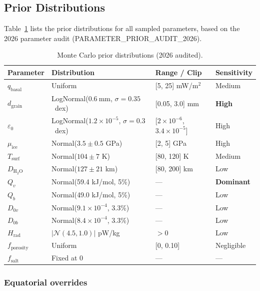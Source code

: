 \documentclass[11pt,a4paper]{article}
\begin{document}
\subsection{Prior Distributions}
\label{sec:priors}

Table~\ref{tab:priors} lists the prior distributions for all sampled
parameters, based on the 2026 parameter audit
(PARAMETER\_PRIOR\_AUDIT\_2026).

\begin{table}[h]
\centering
\caption{Monte Carlo prior distributions (2026 audited).}
\label{tab:priors}
\small
\begin{tabular}{llll}
\toprule
\textbf{Parameter} & \textbf{Distribution} & \textbf{Range / Clip} & \textbf{Sensitivity} \\
\midrule
$q_{\mathrm{basal}}$ & Uniform & [5, 25] mW/m$^2$ & Medium \\
$d_{\mathrm{grain}}$ & LogNormal($\SI{0.6}{\milli\metre}$, $\sigma = 0.35$~dex)
  & [0.05, 3.0] mm & \textbf{High} \\
$\varepsilon_0$ & LogNormal($1.2{\times}10^{-5}$, $\sigma = 0.3$~dex)
  & [$2{\times}10^{-6}$, $3.4{\times}10^{-5}$] & High \\
$\mu_{\mathrm{ice}}$ & Normal($3.5 \pm 0.5$ GPa) & [2, 5] GPa & High \\
$T_{\mathrm{surf}}$ & Normal($104 \pm 7$ K) & [80, 120] K & Medium \\
$D_{\mathrm{H_2O}}$ & Normal($127 \pm 21$ km) & [80, 200] km & Low \\
$Q_v$ & Normal(59.4 kJ/mol, 5\%) & --- & \textbf{Dominant} \\
$Q_b$ & Normal(49.0 kJ/mol, 5\%) & --- & Low \\
$D_{0v}$ & Normal($9.1{\times}10^{-4}$, 3.3\%) & --- & Low \\
$D_{0b}$ & Normal($8.4{\times}10^{-4}$, 3.3\%) & --- & Low \\
$H_{\mathrm{rad}}$ & $|\mathcal{N}(4.5, 1.0)|$ pW/kg & $> 0$ & Low \\
$f_{\mathrm{porosity}}$ & Uniform & [0, 0.10] & Negligible \\
$f_{\mathrm{salt}}$ & Fixed at 0 & --- & --- \\
\bottomrule
\end{tabular}
\end{table}

\subsubsection{Equatorial overrides}
\end{document}
